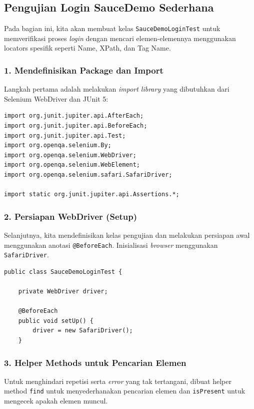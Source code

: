 \documentclass[a4paper,oneside,12pt]{report}
\begin{document}
\subsection{Pengujian Login SauceDemo Sederhana}
Pada bagian ini, kita akan membuat kelas \texttt{SauceDemoLoginTest} untuk memverifikasi proses \textit{login} dengan mencari elemen-elemennya menggunakan locators spesifik seperti Name, XPath, dan Tag Name.

\subsubsection*{1. Mendefinisikan Package dan Import}
Langkah pertama adalah melakukan \textit{import library} yang dibutuhkan dari Selenium WebDriver dan JUnit 5:

\begin{lstlisting}[style=javastyle, caption=Import Dependencies]
import org.junit.jupiter.api.AfterEach;
import org.junit.jupiter.api.BeforeEach;
import org.junit.jupiter.api.Test;
import org.openqa.selenium.By;
import org.openqa.selenium.WebDriver;
import org.openqa.selenium.WebElement;
import org.openqa.selenium.safari.SafariDriver;

import static org.junit.jupiter.api.Assertions.*;
\end{lstlisting}

\subsubsection*{2. Persiapan WebDriver (Setup)}
Selanjutnya, kita mendefinisikan kelas pengujian dan melakukan persiapan awal menggunakan anotasi \texttt{@BeforeEach}. Inisialisasi \textit{browser} menggunakan \texttt{SafariDriver}.

\begin{lstlisting}[style=javastyle, caption=Inisialisasi Kelas dan Setup WebDriver]
public class SauceDemoLoginTest {

    private WebDriver driver;

    @BeforeEach
    public void setUp() {
        driver = new SafariDriver();
    }
\end{lstlisting}

\subsubsection*{3. Helper Methods untuk Pencarian Elemen}
Untuk menghindari repetisi serta \textit{error} yang tak tertangani, dibuat helper method \texttt{find} untuk menyederhanakan pencarian elemen dan \texttt{isPresent} untuk mengecek apakah elemen muncul.
\end{document}
